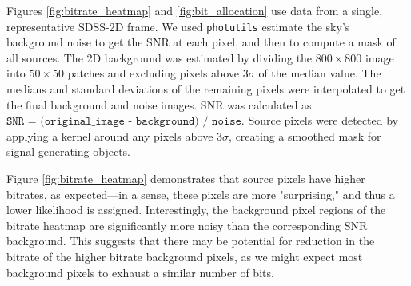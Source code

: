 
Figures \ref{fig:bitrate_heatmap} and \ref{fig:bit_allocation} use data from a single, representative SDSS-2D frame. We used {\texttt{photutils}} \citep{photutils} estimate the sky's background noise to get the SNR at each pixel, and then to compute a mask of all sources. The 2D background was estimated by dividing the $800\times800$ image into $50\times50$ patches and excluding pixels above $3\sigma$ of the median value. The medians and standard deviations of the remaining pixels were interpolated to get the final background and noise images. SNR was calculated as $\texttt{SNR = (original\_image - background) / noise}$. Source pixels were detected by applying a kernel around any pixels above $3\sigma$, creating a smoothed mask for signal-generating objects.

Figure \ref{fig:bitrate_heatmap} demonstrates that source pixels have higher bitrates, as expected—in a sense, these pixels are more "surprising," and thus a lower likelihood is assigned. Interestingly, the background pixel regions of the bitrate heatmap are significantly more noisy than the corresponding SNR background. This suggests that there may be potential for reduction in the bitrate of the higher bitrate background pixels, as we might expect most background pixels to exhaust a similar number of bits.

